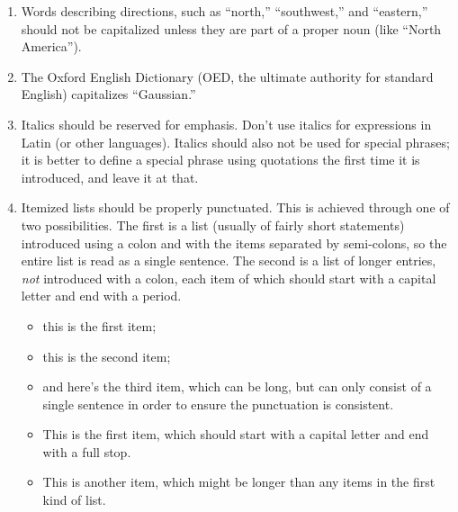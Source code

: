 \documentclass[letterpaper,11pt]{article}
\begin{document}
\begin{enumerate}
\item  Words describing directions, such as ``north,'' ``southwest,'' and
``eastern,'' should not be capitalized unless they are part of a proper noun
(like ``North America'').


\item The Oxford English Dictionary (OED, the ultimate authority for standard
English) capitalizes ``Gaussian.''  

\item
Italics should be reserved for emphasis.
Don't use italics for expressions in Latin (or other languages).  Italics should
also not be used for special phrases; it is better to define a special phrase
using quotations the first time it is introduced, and leave it at that.


\item
Itemized lists should be properly punctuated.  This is achieved through one
of two possibilities.  The first is a list (usually of fairly short
statements) introduced using a colon and with the items separated by
semi-colons, so the entire list is read as a single sentence.
The second is a list of longer entries, {\it not\/} introduced
with a colon, each item of which should start with a capital letter and end with
a period.

\smallskip

\begin{itemize}
\item{this is the first item;}

\item{this is the second item;}

\item{and here's the third item, which can be long, but can only consist
of a single sentence in order to ensure the punctuation is consistent.}
\end{itemize}

\begin{itemize}
\item{This is the first item, which should start with a capital letter
 and end with a full stop.}

\item{This is another item, which might be longer than any items in the
 first kind of list.}


\end{itemize}
\end{enumerate}
\end{document}
